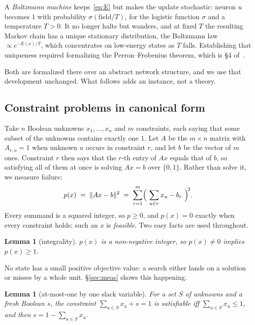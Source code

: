 \documentclass{easychair}
\newtheorem{lemma}[thm]{Lemma}
\newcommand{\secref}[1]{\hyperref[#1]{\textcolor{academicpurple}{\S\ref*{#1}}}}
\newcommand{\citeref}[1]{\textcolor{academicpurple}{\cite{#1}}}
\begin{document}
A \emph{Boltzmann machine} keeps~\eqref{eq:E} but makes the update stochastic: neuron $u$ becomes $1$
with probability $\sigma(\text{field}/T)$, for the logistic function $\sigma$ and a temperature
$T > 0$. It no longer halts but wanders, and at fixed $T$ the resulting Markov chain has a unique
stationary distribution, the Boltzmann law $\propto e^{-E(x)/T}$, which concentrates on low-energy
states as $T$ falls. Establishing that uniqueness required formalizing the Perron--Frobenius theorem,
which is \S4 of~\citeref{hnbm}.

Both are formalized there over an abstract network structure, and we use that development unchanged.
What follows adds an instance, not a theory.

\subsection{Constraint problems in canonical form}\label{sec:qubo}

Take $n$ Boolean unknowns $x_1,\dots,x_n$ and $m$ constraints, each saying that some subset of the
unknowns contains exactly one $1$. Let $A$ be the $m\times n$ matrix with $A_{r,u} = 1$ when unknown
$u$ occurs in constraint $r$, and let $b$ be the vector of $m$ ones. Constraint $r$ then says that the
$r$-th entry of $Ax$ equals that of $b$, so satisfying all of them at once is solving $Ax = b$ over
$\{0,1\}$. Rather than solve it, we measure failure:
\begin{equation}\label{eq:p}
  p(x) \;=\; \lVert Ax - b\rVert^2 \;=\; \sum_{r=1}^{m}\Bigl(\ \sum_{u \in r} x_u - b_r\ \Bigr)^{\!2}.
\end{equation}
Every summand is a squared integer, so $p \ge 0$, and $p(x) = 0$ exactly when every constraint holds;
such an $x$ is \emph{feasible}. Two easy facts are used throughout.

\begin{lemma}[integrality]\label{lem:int}
$p(x)$ is a non-negative integer, so $p(x) \neq 0$ implies $p(x) \ge 1$.
\end{lemma}

No state has a small positive objective value: a search either lands on a solution or misses by a
whole unit. \secref{sec:meas} shows this happening.

\begin{lemma}[at-most-one by one slack variable]\label{lem:slack}
For a set $S$ of unknowns and a fresh Boolean $s$, the constraint $\sum_{u\in S}x_u + s = 1$ is
satisfiable iff $\sum_{u\in S}x_u \le 1$, and then $s = 1 - \sum_{u\in S}x_u$.
\end{lemma}
\end{document}
